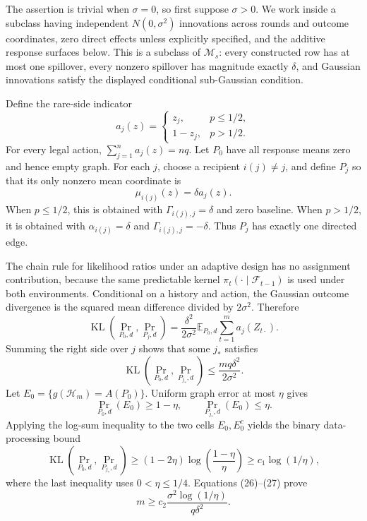 The assertion is trivial when \(\sigma=0\), so first suppose \(\sigma>0\).  We work inside a subclass having independent \(N(0,\sigma^2)\) innovations across rounds and outcome coordinates, zero direct effects unless explicitly specified, and the additive response surfaces below.  This is a subclass of \(\mathcal M_s\): every constructed row has at most one spillover, every nonzero spillover has magnitude exactly \(\delta\), and Gaussian innovations satisfy the displayed conditional sub-Gaussian condition.

Define the rare-side indicator
\[
 a_j(z)=
 \begin{cases}
 z_j,&p\le1/2,\\
 1-z_j,&p>1/2.
 \end{cases}
\]
For every legal action, \(\sum_{j=1}^na_j(z)=nq\).  Let \(P_0\) have all response means zero and hence empty graph.  For each \(j\), choose a recipient \(i(j)\ne j\), and define \(P_j\) so that its only nonzero mean coordinate is
\[
 \mu_{i(j)}(z)=\delta a_j(z).
\]
When \(p\le1/2\), this is obtained with \(\Gamma_{i(j),j}=\delta\) and zero baseline.  When \(p>1/2\), it is obtained with \(\alpha_{i(j)}=\delta\) and \(\Gamma_{i(j),j}=-\delta\).  Thus \(P_j\) has exactly one directed edge.

The chain rule for likelihood ratios under an adaptive design has no assignment contribution, because the same predictable kernel \(\pi_t(\cdot\mid\mathcal F_{t-1})\) is used under both environments.  Conditional on a history and action, the Gaussian outcome divergence is the squared mean difference divided by \(2\sigma^2\).  Therefore
\[
 \operatorname{KL}(\Pr_{P_0,d},\Pr_{P_j,d})
 =\frac{\delta^2}{2\sigma^2}
   \mathbb E_{P_0,d}\sum_{t=1}^m a_j(Z_{t\cdot}).                      \tag{25}
\]
Summing the right side over \(j\) shows that some \(j_*\) satisfies
\[
 \operatorname{KL}(\Pr_{P_0,d},\Pr_{P_{j_*},d})
 \le\frac{m q\delta^2}{2\sigma^2}.                                   \tag{26}
\]
Let \(E_0=\{g(\mathscr H_m)=A(P_0)\}\).  Uniform graph error at most \(\eta\) gives
\[
 \Pr_{P_0,d}(E_0)\ge1-\eta,
 \qquad
 \Pr_{P_{j_*},d}(E_0)\le\eta.
\]
Applying the log-sum inequality to the two cells \(E_0,E_0^c\) yields the binary data-processing bound
\[
 \operatorname{KL}(\Pr_{P_0,d},\Pr_{P_{j_*},d})
 \ge (1-2\eta)\log\!\left(\frac{1-\eta}{\eta}\right)
 \ge c_1\log(1/\eta),                                                 \tag{27}
\]
where the last inequality uses \(0<\eta\le1/4\).  Equations (26)--(27) prove
\[
 m\ge c_2\frac{\sigma^2\log(1/\eta)}{q\delta^2}.                      \tag{28}
\]


